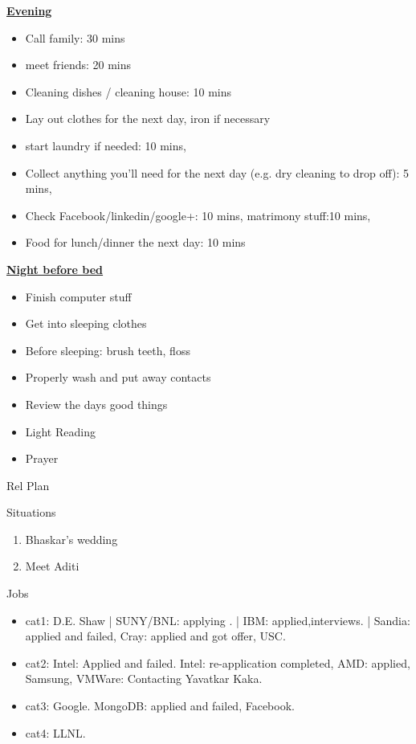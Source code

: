\underline{\bf Evening}
\begin{itemize}
\tiny \item \tiny Call family: 30 mins
\item \tiny meet friends: 20 mins
\item \tiny Cleaning dishes / cleaning house: 10 mins
\item \tiny Lay out clothes for the next day, iron if necessary
\item \tiny start laundry if needed: 10 mins,
\item \tiny Collect anything you’ll need for the next day (e.g. dry
cleaning to drop off): 5 mins,
\item \tiny Check Facebook/linkedin/google+: 10 mins, matrimony stuff:10 mins,
\item \tiny Food for lunch/dinner the next day: 10 mins
\end{itemize}
\underline{\bf Night before bed}
\begin{itemize}
\tiny \item \tiny Finish computer stuff 
\item \tiny Get into sleeping clothes 
\item \tiny Before sleeping: brush teeth, floss  
\item \tiny Properly wash and put away contacts 
\item \tiny Review the days good things  
\item \tiny Light Reading 
\item \tiny Prayer 
\end{itemize}
\begin{frame}{Rel Plan}

\end{frame}
\begin{frame}{Situations}


\begin{enumerate}

\item Bhaskar's wedding
\item Meet Aditi 


\end{enumerate}

\end{frame}
\begin{block}{Jobs}
  \begin{itemize}
    \tiny \item \tiny cat1: D.E. Shaw | SUNY/BNL: applying . | IBM:
    applied,interviews.  | Sandia: applied and failed, Cray: applied and got offer, USC. 
  \item \tiny cat2: Intel: Applied and failed. Intel: re-application  completed, AMD: applied, Samsung, VMWare: Contacting Yavatkar Kaka. 
  \item \tiny cat3: Google. MongoDB: applied and failed, Facebook. 
  \item \tiny cat4: LLNL. 
  \end{itemize} 
\end{block} 

